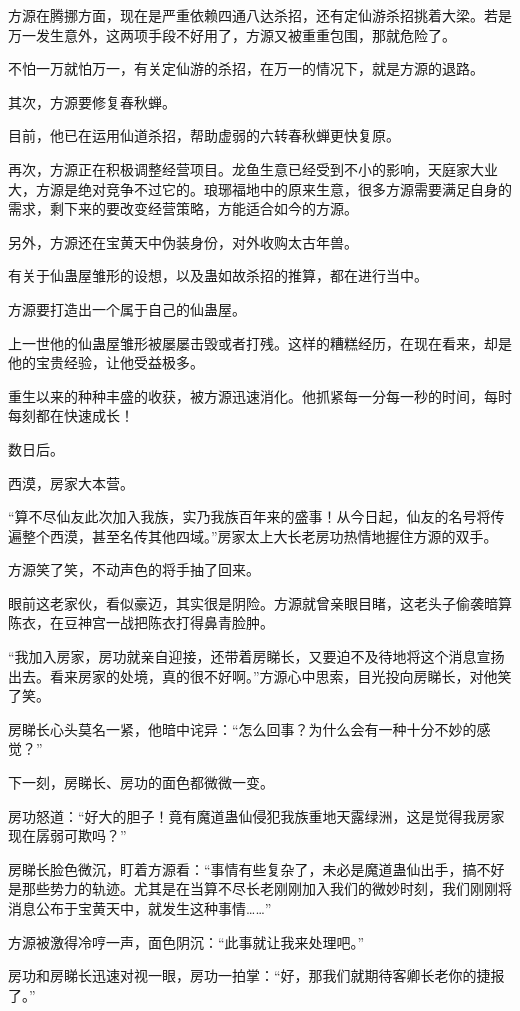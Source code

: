 \begin{this_body}
方源在腾挪方面，现在是严重依赖四通八达杀招，还有定仙游杀招挑着大梁。若是万一发生意外，这两项手段不好用了，方源又被重重包围，那就危险了。

不怕一万就怕万一，有关定仙游的杀招，在万一的情况下，就是方源的退路。

其次，方源要修复春秋蝉。

目前，他已在运用仙道杀招，帮助虚弱的六转春秋蝉更快复原。

再次，方源正在积极调整经营项目。龙鱼生意已经受到不小的影响，天庭家大业大，方源是绝对竞争不过它的。琅琊福地中的原来生意，很多方源需要满足自身的需求，剩下来的要改变经营策略，方能适合如今的方源。

另外，方源还在宝黄天中伪装身份，对外收购太古年兽。

有关于仙蛊屋雏形的设想，以及蛊如故杀招的推算，都在进行当中。

方源要打造出一个属于自己的仙蛊屋。

上一世他的仙蛊屋雏形被屡屡击毁或者打残。这样的糟糕经历，在现在看来，却是他的宝贵经验，让他受益极多。

重生以来的种种丰盛的收获，被方源迅速消化。他抓紧每一分每一秒的时间，每时每刻都在快速成长！

数日后。

西漠，房家大本营。

“算不尽仙友此次加入我族，实乃我族百年来的盛事！从今日起，仙友的名号将传遍整个西漠，甚至名传其他四域。”房家太上大长老房功热情地握住方源的双手。

方源笑了笑，不动声色的将手抽了回来。

眼前这老家伙，看似豪迈，其实很是阴险。方源就曾亲眼目睹，这老头子偷袭暗算陈衣，在豆神宫一战把陈衣打得鼻青脸肿。

“我加入房家，房功就亲自迎接，还带着房睇长，又要迫不及待地将这个消息宣扬出去。看来房家的处境，真的很不好啊。”方源心中思索，目光投向房睇长，对他笑了笑。

房睇长心头莫名一紧，他暗中诧异：“怎么回事？为什么会有一种十分不妙的感觉？”

下一刻，房睇长、房功的面色都微微一变。

房功怒道：“好大的胆子！竟有魔道蛊仙侵犯我族重地天露绿洲，这是觉得我房家现在孱弱可欺吗？”

房睇长脸色微沉，盯着方源看：“事情有些复杂了，未必是魔道蛊仙出手，搞不好是那些势力的轨迹。尤其是在当算不尽长老刚刚加入我们的微妙时刻，我们刚刚将消息公布于宝黄天中，就发生这种事情……”

方源被激得冷哼一声，面色阴沉：“此事就让我来处理吧。”

房功和房睇长迅速对视一眼，房功一拍掌：“好，那我们就期待客卿长老你的捷报了。”

\end{this_body}


